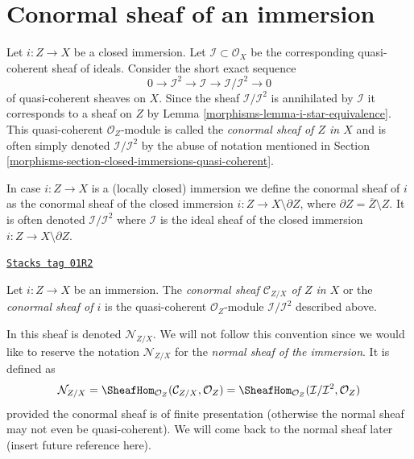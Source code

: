 \section{Conormal sheaf of an immersion}
\label{morphisms-section-conormal-sheaf}
Let $i : Z \to X$ be a closed immersion. Let
$\mathcal{I} \subset \mathcal{O}_X$ be the corresponding quasi-coherent
sheaf of ideals. Consider the short exact sequence
$$
0 \to \mathcal{I}^2 \to \mathcal{I} \to \mathcal{I}/\mathcal{I}^2 \to 0
$$
of quasi-coherent sheaves on $X$. Since the sheaf $\mathcal{I}/\mathcal{I}^2$
is annihilated by $\mathcal{I}$ it corresponds to a sheaf on $Z$ by
Lemma \ref{morphisms-lemma-i-star-equivalence}. This quasi-coherent
$\mathcal{O}_Z$-module is called the {\it conormal sheaf of $Z$ in $X$}
and is often simply denoted
$\mathcal{I}/\mathcal{I}^2$ by the abuse of notation mentioned in
Section \ref{morphisms-section-closed-immersions-quasi-coherent}.

\medskip\noindent
In case $i : Z \to X$ is a (locally closed) immersion we define the
conormal sheaf of $i$ as the conormal sheaf of the closed
immersion $i : Z \to X \setminus \partial Z$, where
$\partial Z = \overline{Z} \setminus Z$. It is often denoted
$\mathcal{I}/\mathcal{I}^2$ where $\mathcal{I}$ is the ideal sheaf
of the closed immersion $i : Z \to X \setminus \partial Z$.

\begin{definition}
\label{morphisms-definition-conormal-sheaf}
\href{https://stacks.math.columbia.edu/tag/01R2}{\texttt{Stacks tag 01R2}}

Let $i : Z \to X$ be an immersion. The {\it conormal sheaf
$\mathcal{C}_{Z/X}$ of $Z$ in $X$} or the {\it conormal sheaf of $i$}
is the quasi-coherent $\mathcal{O}_Z$-module $\mathcal{I}/\mathcal{I}^2$
described above.
\end{definition}

In \cite[IV Definition 16.1.2]{EGA} this sheaf is denoted
$\mathcal{N}_{Z/X}$. We will not follow this convention since we would
like to reserve the notation $\mathcal{N}_{Z/X}$
for the {\it normal sheaf of the immersion}. It is defined as
$$
\mathcal{N}_{Z/X} =
\SheafHom_{\mathcal{O}_Z}(\mathcal{C}_{Z/X}, \mathcal{O}_Z) =
\SheafHom_{\mathcal{O}_Z}(\mathcal{I}/\mathcal{I}^2, \mathcal{O}_Z)
$$
provided the conormal sheaf is of finite presentation (otherwise the
normal sheaf may not even be quasi-coherent). We will come back to the
normal sheaf later (insert future reference here).

